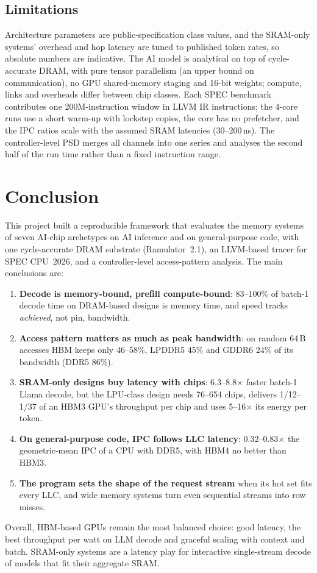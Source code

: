 \documentclass[12pt]{article}
\newcommand{\tmx}{\ensuremath{\times}}
\begin{document}
\subsection{Limitations}
Architecture parameters are public-specification class values, and the SRAM-only systems' overhead and hop latency are tuned to published token rates, so absolute numbers are indicative. The AI model is analytical on top of cycle-accurate DRAM, with pure tensor parallelism (an upper bound on communication), no GPU shared-memory staging and 16-bit weights; compute, links and overheads differ between chip classes. Each SPEC benchmark contributes one 200M-instruction window in LLVM IR instructions; the 4-core runs use a short warm-up with lockstep copies, the core has no prefetcher, and the IPC ratios scale with the assumed SRAM latencies (30--200\,ns). The controller-level PSD merges all channels into one series and analyses the second half of the run time rather than a fixed instruction range.
\newpage

\section{Conclusion}\label{sec:conclusion}
This project built a reproducible framework that evaluates the memory systems of seven AI-chip archetypes on AI inference and on general-purpose code, with one cycle-accurate DRAM substrate (Ramulator~2.1), an LLVM-based tracer for SPEC CPU~2026, and a controller-level access-pattern analysis. The main conclusions are:
\begin{enumerate}
\item \textbf{Decode is memory-bound, prefill compute-bound}: 83--100\% of batch-1 decode time on DRAM-based designs is memory time, and speed tracks \emph{achieved}, not pin, bandwidth.
\item \textbf{Access pattern matters as much as peak bandwidth}: on random 64\,B accesses HBM keeps only 46--58\%, LPDDR5 45\% and GDDR6 24\% of its bandwidth (DDR5 86\%).
\item \textbf{SRAM-only designs buy latency with chips}: 6.3--8.8\tmx{} faster batch-1 Llama decode, but the LPU-class design needs 76--654 chips, delivers 1/12--1/37 of an HBM3 GPU's throughput per chip and uses 5--16\tmx{} its energy per token.
\item \textbf{On general-purpose code, IPC follows LLC latency}: 0.32--0.83\tmx{} the geometric-mean IPC of a CPU with DDR5, with HBM4 no better than HBM3.
\item \textbf{The program sets the shape of the request stream} when its hot set fits every LLC, and wide memory systems turn even sequential streams into row misses.
\end{enumerate}
Overall, HBM-based GPUs remain the most balanced choice: good latency, the best throughput per watt on LLM decode and graceful scaling with context and batch. SRAM-only systems are a latency play for interactive single-stream decode of models that fit their aggregate SRAM.
\end{document}
